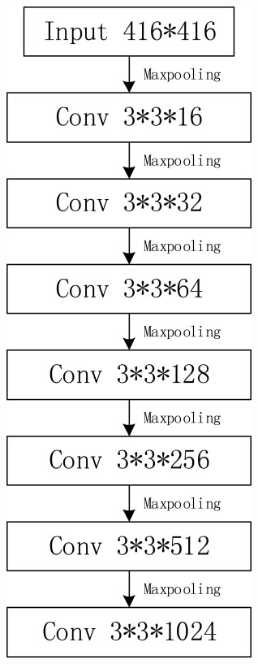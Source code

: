 \begin{figure}[!ht]
\begin{subfigure}[b]{0.2\textwidth}
        \includegraphics[width=\textwidth]{chapter2/images/yolo_tiny.jpg}

\end{subfigure}
\end{figure}
